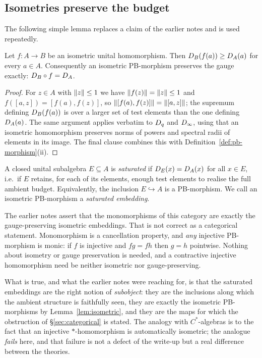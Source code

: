 \subsection{Isometries preserve the budget}

The following simple lemma replaces a claim of the earlier notes and is used
repeatedly.

\begin{lemma}\label{lem:isometric}
Let $f:A\to B$ be an isometric unital homomorphism.  Then
$D_B(f(a))\ge D_A(a)$ for every $a\in A$.  Consequently an isometric
PB-morphism preserves the gauge exactly:
$D_B\circ f=D_A$.
\end{lemma}

\begin{proof}
For $z\in A$ with $\left\lVert z\right\rVert\le1$ we have $\left\lVert f(z)\right\rVert=\left\lVert z\right\rVert\le1$ and
$f([a,z])=[f(a),f(z)]$, so
$\left\lVert[f(a),f(z)]\right\rVert=\left\lVert[a,z]\right\rVert$; the supremum defining $D_B(f(a))$ is
over a larger set of test elements than the one defining $D_A(a)$.  The
same argument applies verbatim to $D_q$ and $D_\infty$, using that an
isometric homomorphism preserves norms of powers and spectral radii of elements
in its image.  The final clause combines this with
Definition~\ref{def:pb-morphism}(ii).
\end{proof}

\begin{definition}\label{def:saturated}
A closed unital subalgebra $E\subseteq A$ is \emph{saturated} if
$D_E(x)=D_A(x)$ for all $x\in E$, i.e.\ if $E$ retains, for each of
its elements, enough test elements to realise the full ambient budget.
Equivalently, the inclusion $E\hookrightarrow A$ is a PB-morphism.  We call an
isometric PB-morphism a \emph{saturated embedding}.
\end{definition}

\begin{remark}\label{rem:mono-correction}
The earlier notes assert that the monomorphisms of this category are exactly
the gauge-preserving isometric embeddings.  That is not correct as a
categorical statement.  Monomorphism is a cancellation property, and \emph{any}
injective PB-morphism is monic: if $f$ is injective and $fg=fh$ then $g=h$
pointwise.  Nothing about isometry or gauge preservation is needed, and a
contractive injective homomorphism need be neither isometric nor
gauge-preserving.

What is true, and what the earlier notes were reaching for, is that the
saturated embeddings are the right notion of \emph{subobject}: they are the
inclusions along which the ambient structure is faithfully seen, they are
exactly the isometric PB-morphisms by Lemma~\ref{lem:isometric}, and they are
the maps for which the obstruction of \S\ref{sec:categorical} is stated.  The
analogy with $C^*$-algebras is to the fact that an injective
$*$-homomorphism is automatically isometric; the analogue \emph{fails} here,
and that failure is not a defect of the write-up but a real difference between
the theories.
\end{remark}

